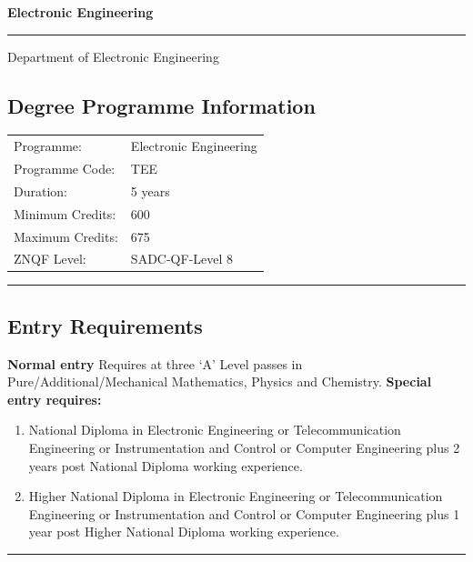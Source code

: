 \begin{center}
\large\textsf{\textbf{Electronic Engineering}}\vspace{0.5ex}\hrule\vspace{0.5ex}
\large\textsf{Department of Electronic Engineering}
\end{center}
\subsection*{Degree Programme Information}
\vspace{0ex}%
\noindent\parbox{0.5\textwidth}{%
    \noindent\begin{tabular}{@{}ll}
                 \textsf{Programme:}          & 	Electronic Engineering  \\
                 \textsf{Programme Code:}         & 	TEE    \\
                 \textsf{Duration:}         & 	5 years    \\
                 \textsf{Minimum Credits:}    & 	600 \\
                 \textsf{Maximum Credits:}    & 	675 \\
                 \textsf{ZNQF Level:}    & 	SADC-QF-Level 8
    \end{tabular}}
\vspace{2ex}\hrule\vspace{2ex}


\subsection*{Entry Requirements}
\begin{outline}
    \1      \textbf{Normal entry} \newline Requires at three ‘A’ Level passes in Pure/Additional/Mechanical Mathematics, Physics and Chemistry.
    \1      \textbf{Special entry requires:}
    \begin{enumerate}[label=\alph*)]
        \item National Diploma in Electronic Engineering or Telecommunication Engineering or Instrumentation and Control or Computer Engineering plus 2 years post National Diploma working experience.
        \item Higher National Diploma in Electronic Engineering or Telecommunication Engineering or Instrumentation and Control or Computer Engineering plus 1 year post Higher National Diploma working experience.
    \end{enumerate}
\end{outline}
\vspace{2ex} \hrule\vspace{2ex}

